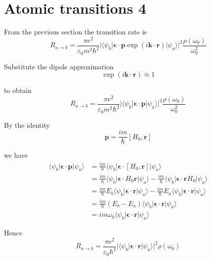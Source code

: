 

\section*{Atomic transitions 4}

From the previous section the transition rate is
\begin{equation*}
R_{a\rightarrow b}
=\frac{\pi e^2}{\varepsilon_0m^2\hbar^2}
\bigl|\langle\psi_b|\boldsymbol{\epsilon}\cdot\mathbf p\exp(i\mathbf k\cdot\mathbf r)|\psi_a\rangle\bigr|^2
\frac{\rho(\omega_0)}{\omega_0^2}
\end{equation*}

Substitute the dipole approximation
\begin{equation*}
\exp(i\mathbf k\cdot\mathbf r)\approx1
\end{equation*}

to obtain
\begin{equation*}
R_{a\rightarrow b}
=\frac{\pi e^2}{\varepsilon_0m^2\hbar^2}
\bigl|\langle\psi_b|\boldsymbol{\epsilon}\cdot\mathbf p|\psi_a\rangle\bigr|^2
\frac{\rho(\omega_0)}{\omega_0^2}
\end{equation*}

By the identity
\begin{equation*}
\mathbf p=\frac{im}{\hbar}[H_0,\mathbf r]
\tag{1}
\end{equation*}

we have
\begin{align*}
\langle\psi_b|\boldsymbol{\epsilon}\cdot\mathbf p|\psi_a\rangle
&=\frac{im}{\hbar}\langle\psi_b|\boldsymbol{\epsilon}\cdot[H_0,\mathbf r]|\psi_a\rangle
\\
&=\frac{im}{\hbar}\langle\psi_b|\boldsymbol{\epsilon}\cdot H_0\mathbf r|\psi_a\rangle
-\frac{im}{\hbar}\langle\psi_b|\boldsymbol{\epsilon}\cdot\mathbf rH_0|\psi_a\rangle
\\
&=\frac{im}{\hbar}E_b\langle\psi_b|\boldsymbol{\epsilon}\cdot\mathbf r|\psi_a\rangle
-\frac{im}{\hbar}E_a\langle\psi_b|\boldsymbol{\epsilon}\cdot\mathbf r|\psi_a\rangle
\\
&=\frac{im}{\hbar}(E_b-E_a)\langle\psi_b|\boldsymbol{\epsilon}\cdot\mathbf r|\psi_a\rangle
\\
&=im\omega_0\langle\psi_b|\boldsymbol{\epsilon}\cdot\mathbf r|\psi_a\rangle
\end{align*}

Hence
\begin{equation*}
R_{a\rightarrow b}
=\frac{\pi e^2}{\varepsilon_0\hbar^2}
\bigl|\langle\psi_b|\boldsymbol{\epsilon}\cdot\mathbf r|\psi_a\rangle\bigr|^2
\rho(\omega_0)
\end{equation*}

